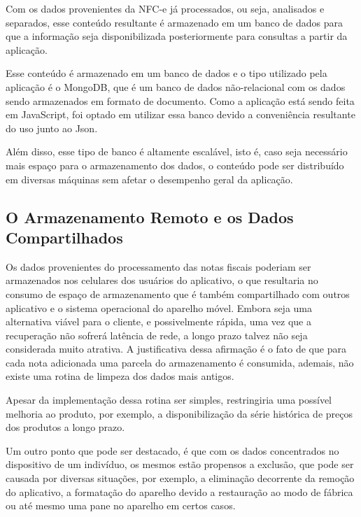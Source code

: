 Com os dados provenientes da NFC-e já processados, ou seja, analisados e separados, esse conteúdo resultante é armazenado em um banco de dados para que a informação seja disponibilizada posteriormente para consultas a partir da aplicação.

Esse conteúdo é armazenado em um banco de dados e o tipo utilizado pela aplicação é o MongoDB, que é um banco de dados não-relacional com os dados sendo armazenados em formato de documento. Como a aplicação está sendo feita em JavaScript, foi optado em utilizar essa banco devido a conveniência resultante do uso junto ao Json.

Além disso, esse tipo de banco é altamente escalável, isto é, caso seja necessário mais espaço para o armazenamento dos dados, o conteúdo pode ser distribuído em diversas máquinas sem afetar o desempenho geral da aplicação.

\subsection{O Armazenamento Remoto e os Dados Compartilhados}

Os dados provenientes do processamento das notas fiscais poderiam ser armazenados nos celulares dos usuários do aplicativo, o que resultaria no consumo de espaço de armazenamento que é também compartilhado com outros aplicativo e o sistema operacional do aparelho móvel. Embora seja uma alternativa viável para o cliente, e possivelmente rápida, uma vez que a recuperação não sofrerá latência de rede, a longo prazo talvez não seja considerada muito atrativa. A justificativa dessa afirmação é o fato de que para cada nota adicionada uma parcela do armazenamento é consumida, ademais, não existe uma rotina de limpeza dos dados mais antigos.

Apesar da implementação dessa rotina ser simples, restringiria uma possível melhoria ao produto, por exemplo, a disponibilização da série histórica de preços dos produtos a longo prazo.

Um outro ponto que pode ser destacado, é que com os dados concentrados no dispositivo de um indivíduo, os mesmos estão propensos a exclusão, que pode ser causada por diversas situações, por exemplo, a eliminação decorrente da remoção do aplicativo, a formatação do aparelho devido a restauração ao modo de fábrica ou até mesmo uma pane no aparelho em certos casos.

